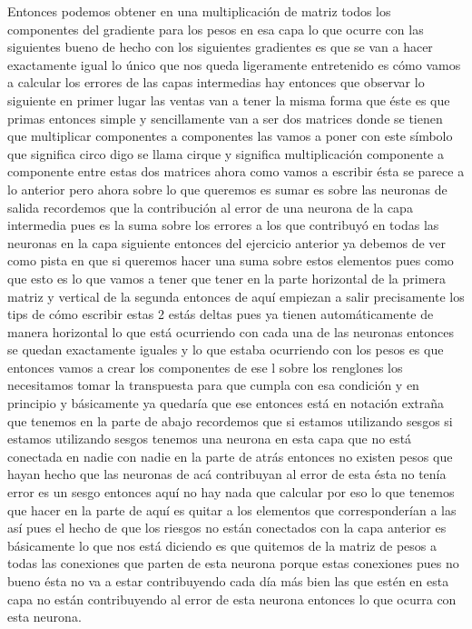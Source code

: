 Entonces podemos obtener en una multiplicación de matriz todos los componentes del gradiente para los pesos en esa capa lo que ocurre con las siguientes bueno de hecho con los siguientes gradientes es que se van a hacer exactamente igual lo único que nos queda ligeramente entretenido es cómo vamos a calcular los errores de las capas intermedias hay entonces que observar lo siguiente en primer lugar las ventas van a tener la misma forma que éste es que primas entonces simple y sencillamente van a ser dos matrices donde se tienen que multiplicar componentes a componentes las vamos a poner con este símbolo que significa circo digo se llama cirque y significa multiplicación componente a componente entre estas dos matrices ahora como vamos a escribir ésta se parece a lo anterior pero ahora sobre lo que queremos es sumar es sobre las neuronas de salida recordemos que la contribución al error de una neurona de la capa intermedia pues es la suma sobre los errores a los que contribuyó en todas las neuronas en la capa siguiente entonces del ejercicio anterior ya debemos de ver como pista en que si queremos hacer una suma sobre estos elementos pues como que esto es lo que vamos a tener que tener en la parte horizontal de la primera matriz y vertical de la segunda entonces de aquí empiezan a salir precisamente los tips de cómo escribir estas 2 estás deltas pues ya tienen automáticamente de manera horizontal lo que está ocurriendo con cada una de las neuronas entonces se quedan exactamente iguales y lo que estaba ocurriendo con los pesos es que entonces vamos a crear los componentes de ese l sobre los renglones los necesitamos tomar la transpuesta para que cumpla con esa condición y en principio y básicamente ya quedaría que ese entonces está en notación extraña que tenemos en la parte de abajo recordemos que si estamos utilizando sesgos si estamos utilizando sesgos tenemos una neurona en esta capa que no está conectada en nadie con nadie en la parte de atrás entonces no existen pesos que hayan hecho que las neuronas de acá contribuyan al error de esta ésta no tenía error es un sesgo entonces aquí no hay nada que calcular por eso lo que tenemos que hacer en la parte de aquí es quitar a los elementos que corresponderían a las así pues el hecho de que los riesgos no están conectados con la capa anterior es básicamente lo que nos está diciendo es que quitemos de la matriz de pesos a todas las conexiones que parten de esta neurona porque estas conexiones pues no bueno ésta no va a estar contribuyendo cada día más bien las que estén en esta capa no están contribuyendo al error de esta neurona entonces lo que ocurra con esta neurona. 
